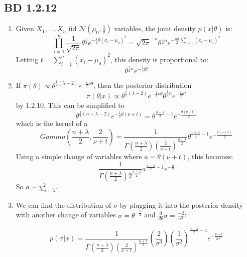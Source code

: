 \documentclass[a4paper,12pt]{article}
\begin{document}
\subsection{BD 1.2.12}
\begin{enumerate}
  \item Given $X_1,...,X_n$ iid $\mathcal{N}(\mu_0,\frac{1}{\theta})$ variables, the joint density $p(x|\theta)$ is:
  $$\prod_{i=1}^n \frac{1}{\sqrt{2\pi}}\theta^{\frac{1}{2}}e^{-\frac{1}{2}\theta(x_i-\mu_0)^2}=\sqrt{2\pi}^{-n} \theta^{\frac{1}{2}n}e^{-\frac{n\theta}{2}\sum_{i=1}^n(x_i-\mu_0)^2}$$
  Letting $t=\sum_{i=1}^n (x_i-\mu_0)^2$, this density is proportional to:$$\theta^{\frac{1}{2}n}e^{-\frac{1}{2}\theta t}$$
  \item If $\pi(\theta)\propto\theta^{\frac{1}{2}(\lambda-2)}e^{-\frac{1}{2}\nu\theta}$, then the posterior distribution $$\pi(\theta|x)\propto\theta^{\frac{1}{2}(\lambda-2)}e^{-\frac{1}{2}\nu\theta} \theta^{\frac{1}{2}n}e^{-\frac{1}{2}\theta t}$$ by 1.2.10. This can be simplified to
  $$\theta^{\frac{1}{2}(n+\lambda-2)}e^{-\frac{1}{2}\theta(\nu+t)}=\theta^{\frac{n+\lambda}{2}-1}e^{-\frac{\theta(\nu+t)}{2}}$$
  which is the kernel of a $$Gamma(\frac{n+\lambda}{2},\frac{2}{\nu+t})=\frac{1}{\Gamma(\frac{n+\lambda}{2})(\frac{2}{\nu+t})^{\frac{n+\lambda}{2}}}\theta^{\frac{n+\lambda}{2}-1}e^{-\frac{\theta(\nu+t)}{2}}$$
  Using a simple change of variables where $a=\theta(\nu+t)$, this becomes:$$\frac{1}{\Gamma(\frac{n+\lambda}{2})2^{\frac{n+\lambda}{2}}}a^{\frac{n+\lambda}{2}-1}e^{-\frac{a}{2}}$$ So $a\sim\chi_{n+\lambda}^2$.
  \item We can find the distribution of $\sigma$ by plugging it into the posterior density with another change of variables $\sigma=\theta^{-\frac{1}{2}}$ and $\frac{d}{d\theta}\sigma=\frac{-2}{\sigma^3}$:

  $$p(\sigma|x)=\frac{1}{\Gamma(\frac{n+\lambda}{2})(\frac{2}{\nu+t})^{\frac{n+\lambda}{2}}}(\frac{2}{\sigma^3})(\frac{1}{\sigma^2})^{\frac{n+\lambda}{2}-1}e^{-\frac{\nu+t}{2\sigma^2}}$$
\end{enumerate}
\end{document}
